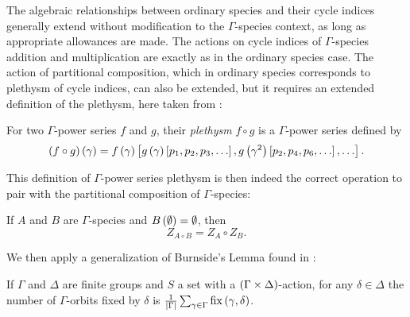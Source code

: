 \documentclass[sectionflow,singlespace,twoside]{brandiss} %
\numberwithin{section}{chapter}
\numberwithin{figure}{chapter}
\begin{document}
The algebraic relationships between ordinary species and their cycle indices generally extend without modification to the $\Gamma$-species context, as long as appropriate allowances are made.
The actions on cycle indices of $\Gamma$-species addition and multiplication are exactly as in the ordinary species case.
The action of partitional composition, which in ordinary species corresponds to plethysm of cycle indices, can also be extended, but it requires an extended definition of the plethysm, here taken from \cite[\S 3]{hend:specfield}:
\begin{definition}\label{def:gpspleth}
  For two $\Gamma$-power series $f$ and $g$, their \emph{plethysm} $f \circ g$ is a $\Gamma$-power series defined by
  \begin{equation}
    \left( {f \circ g} \right) \left( {\gamma} \right) = f \left( {\gamma} \right) \left[ {g \left( {\gamma} \right) \left[ {p_{1}, p_{2}, p_{3}, \dots} \right], g \left( {\gamma^{2}} \right) \left[ {p_{2}, p_{4}, p_{6}, \dots} \right], \dots} \right].
    \label{eq:gpspleth}
  \end{equation}
\end{definition}
This definition of $\Gamma$-power series plethysm is then indeed the correct operation to pair with the partitional composition of $\Gamma$-species:
\begin{theorem}
  \label{thm:gspeccomp}
  If $A$ and $B$ are $\Gamma$-species and $B \left( {\emptyset} \right) = \emptyset$, then
  \begin{equation}
    \label{eq:gspeccomp}
    Z_{A \circ B} = Z_{A} \circ Z_{B}.
  \end{equation}
\end{theorem}

We then apply a generalization of Burnside's Lemma found in \cite[Lemma 5]{gessel:laginvspec}:
\begin{lemma}
  \label{lem:grouporbits}
  If $\Gamma$ and $\Delta$ are finite groups and $S$ a set with a $\left( {\Gamma \times \Delta} \right)$-action, for any $\delta \in \Delta$ the number of $\Gamma$-orbits fixed by $\delta$ is $\frac{1}{\left\vert {\Gamma} \right\vert} \sum_{\gamma \in \Gamma} \operatorname{fix} \left( {\gamma, \delta} \right)$.
\end{lemma}
\end{document}
